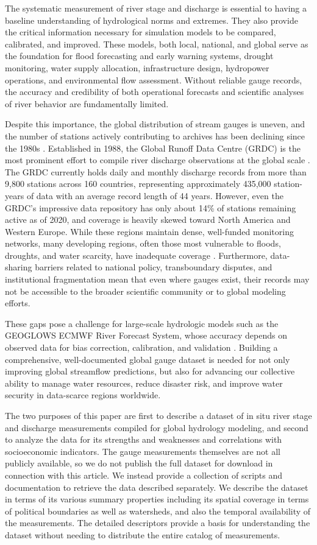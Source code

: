 The systematic measurement of river stage and discharge is essential to having a baseline understanding of hydrological norms and extremes. They also
provide the critical information necessary for simulation models to be compared, calibrated, and improved. These models, both local, national, and
global serve as the foundation for flood forecasting and early warning systems, drought monitoring, water supply allocation, infrastructure design,
hydropower operations, and environmental flow assessment. Without reliable gauge records, the accuracy and credibility of both operational forecasts
and scientific analyses of river behavior are fundamentally limited.

Despite this importance, the global distribution of stream gauges is uneven, and the number of stations actively contributing to archives has been
declining since the 1980s \citep{ruhi2018}. Established in 1988, the Global Runoff Data Centre (GRDC) is the most prominent effort to compile
river discharge observations at the global scale \citep{grdc2024}. The GRDC currently holds daily and monthly discharge records from more than 9,800
stations across 160 countries, representing approximately 435,000 station-years of data with an average record length of 44 years. However, even the
GRDC's impressive data repository has only about 14\% of stations remaining active as of 2020, and coverage is heavily skewed toward North America
and Western Europe. While these regions maintain dense, well-funded monitoring networks, many developing regions, often those most vulnerable to
floods, droughts, and water scarcity, have inadequate coverage \citep{mishra2009}. Furthermore, data-sharing barriers related to national policy,
transboundary disputes, and institutional fragmentation mean that even where gauges exist, their records may not be accessible to the broader
scientific community or to global modeling efforts.

These gaps pose a challenge for large-scale hydrologic models such as the GEOGLOWS ECMWF River Forecast System, whose accuracy depends on observed
data for bias correction, calibration, and validation \citep{hales2022,sanchezlozano2021}
. Building a comprehensive, well-documented global gauge dataset is needed for not only improving global streamflow predictions, but also for
advancing our collective ability to manage water resources, reduce disaster risk, and improve water security in data-scarce regions worldwide.

The two purposes of this paper are first to describe a dataset of in situ river stage and discharge measurements compiled for global hydrology
modeling, and second to analyze the data for its strengths and weaknesses and correlations with socioeconomic indicators. The gauge measurements
themselves are not all publicly available, so we do not publish the full dataset for download in connection with this article. We instead provide a
collection of scripts and documentation to retrieve the data described separately. We describe the dataset in terms of its various summary properties
including its spatial coverage in terms of political boundaries as well as watersheds, and also the temporal availability of the measurements. The
detailed descriptors provide a basis for understanding the dataset without needing to distribute the entire catalog of measurements.
